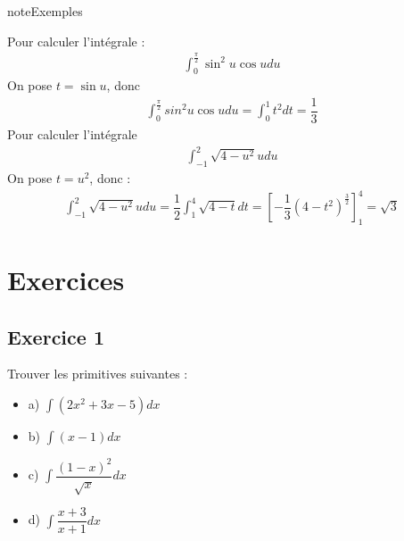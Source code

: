 \documentclass[letterpaper,10pt,french]{jupyterBook}
\begin{document}
\begin{sphinxadmonition}{note}{Exemples}

\sphinxhyphen{} Pour calculer l’intégrale :
\begin{equation*}
\begin{split}
\int_0^{\frac{\pi}{2}} \sin^2 u \cos u du
\end{split}
\end{equation*}
\sphinxAtStartPar
On pose \(t = \sin u\), donc
\begin{equation*}
\begin{split}
\int_0^{\frac{\pi}{2}} sin^2 u \cos u du = \int_0^{1} t^2 dt = \dfrac{1}{3}
\end{split}
\end{equation*}
\sphinxhyphen{} Pour calculer l’intégrale
\begin{equation*}
\begin{split}
\int_{-1}^2 \sqrt{4-u^2} u du
\end{split}
\end{equation*}
\sphinxAtStartPar
On pose \(t = u^2\), donc :
\begin{equation*}
\begin{split}
\int_{-1}^2 \sqrt{4-u^2} u du = \dfrac{1}{2}\int_1^4 \sqrt{4-t}dt = [-\dfrac{1}{3}(4-t^2)^{\frac{3}{2}}]_1^4 = \sqrt{3}
\end{split}
\end{equation*}\end{sphinxadmonition}


\section{Exercices}
\label{\detokenize{exoint:exercices}}\label{\detokenize{exoint::doc}}

\subsection{Exercice 1}
\label{\detokenize{exoint:exercice-1}}
\sphinxAtStartPar
Trouver les primitives suivantes :
\begin{itemize}
\item {} 
\sphinxAtStartPar
a) \( \int (2x^2 + 3x - 5)dx\)

\item {} 
\sphinxAtStartPar
b) \(\int (x-1) dx\)

\item {} 
\sphinxAtStartPar
c) \(\int \dfrac{(1-x)^2}{\sqrt{x}}dx\)

\item {} 
\sphinxAtStartPar
d) \(\int \dfrac{x+3}{x+1}dx\)

\end{itemize}
\end{document}
